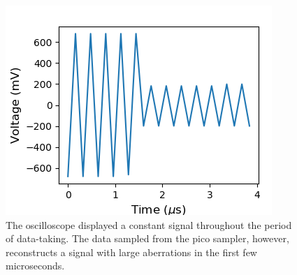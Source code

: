 \documentclass[a4paper]{article}
\begin{document}
\begin{figure}
\centering
\includegraphics{5-2/pico_bad} %
\caption{The oscilloscope displayed a constant signal throughout the period of data-taking. The data sampled from the pico sampler, however, reconstructs a signal with large aberrations in the first few microseconds.}
\label{fig:pico_start}
\end{figure}
\end{document}
